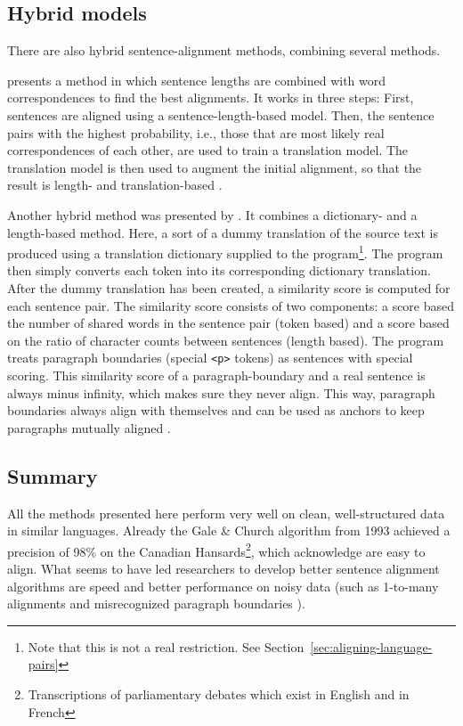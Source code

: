 \subsection{Hybrid models}
There are also hybrid sentence-alignment methods, combining several methods.


\cite{moore2002fast} presents a method in which sentence lengths are combined with word correspondences to find the best alignments. 
It works in three steps:
First, sentences are aligned using a sentence-length-based model. 
Then, the sentence pairs with the highest probability, i.e., those that are most likely real correspondences of each other, are used to train a translation model. 
The translation model is then used to augment the initial alignment, so that the result is length- and translation-based \autocite{moore2002fast}.

Another hybrid method was presented by \cite{hunalign}. 
It combines a dictionary- and a length-based method.
Here, a sort of a dummy translation of the source text is produced using a translation dictionary supplied to the program\footnote{Note that this is not a real restriction. See Section~\ref{sec:aligning-language-pairs}}. 
The program then simply converts each token into its corresponding dictionary translation.
After the dummy translation has been created, a similarity score is computed for each sentence pair.
The similarity score consists of two components: a score based the number of shared words in the sentence pair (token based) and  a score based on the ratio of character counts between sentences (length based). 
The program treats paragraph boundaries (special \texttt{<p>} tokens) as sentences with special scoring. 
This similarity score of a paragraph-boundary  and a real sentence is always minus infinity, which makes sure they never align. This way, paragraph boundaries always align with themselves and can be used as anchors to keep  paragraphs mutually aligned \autocite{hunalign}.

\subsection{Summary}
All the methods presented here perform very well on clean, well-structured data in similar languages. Already the Gale \& Church algorithm from 1993 achieved a precision of 98\% on the Canadian Hansards\footnote{Transcriptions of parliamentary debates which exist in English and in French}, which \citeauthor{gale-church-1991-program} acknowledge are easy to align. 
What seems to have led researchers to develop better sentence alignment algorithms are speed \autocites{chen-1993-aligning,hunalign} and better performance on noisy data (such as 1-to-many alignments and misrecognized paragraph boundaries \autocite{sennrich-volk-2010-mt}). 


